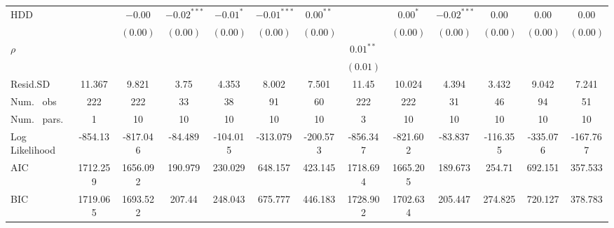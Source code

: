 \begin{table}
\begin{center}
\begin{tabular}{l c c c c c c c c c c c c}
HDD                               &               & $-0.00$       & $-0.02^{***}$ & $-0.01^{*}$    & $-0.01^{***}$  & $0.00^{**}$   &               & $0.00^{*}$    & $-0.02^{***}$ & $0.00$         & $0.00$        & $0.00$        \\
                                  &               & $(0.00)$      & $(0.00)$      & $(0.00)$       & $(0.00)$       & $(0.00)$      &               & $(0.00)$      & $(0.00)$      & $(0.00)$       & $(0.00)$      & $(0.00)$      \\
$\rho$                            &               &               &               &                &                &               & $0.01^{**}$   &               &               &                &               &               \\
                                  &               &               &               &                &                &               & $(0.01)$      &               &               &                &               &               \\
\hline
Resid.SD                          & 11.367        & 9.821         & 3.75          & 4.353          & 8.002          & 7.501         & 11.45         & 10.024        & 4.394         & 3.432          & 9.042         & 7.241         \\
Num. \ obs                        & 222           & 222           & 33            & 38             & 91             & 60            & 222           & 222           & 31            & 46             & 94            & 51            \\
Num. \ pars.                      & 1             & 10            & 10            & 10             & 10             & 10            & 3             & 10            & 10            & 10             & 10            & 10            \\
Log Likelihood                    & -854.13       & -817.046      & -84.489       & -104.015       & -313.079       & -200.573      & -856.347      & -821.602      & -83.837       & -116.355       & -335.076      & -167.767      \\
AIC                               & 1712.259      & 1656.092      & 190.979       & 230.029        & 648.157        & 423.145       & 1718.694      & 1665.205      & 189.673       & 254.71         & 692.151       & 357.533       \\
BIC                               & 1719.065      & 1693.522      & 207.44        & 248.043        & 675.777        & 446.183       & 1728.902      & 1702.634      & 205.447       & 274.825        & 720.127       & 378.783       \\

\end{tabular}
\end{center}
\end{table}
